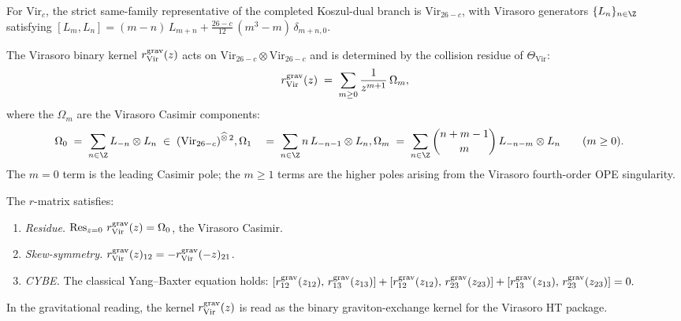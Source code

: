 \begin{construction}
\label{constr:thqg-V-vir-r-explicit}
For $\mathrm{Vir}_c$, the strict same-family representative of the
completed Koszul-dual branch is $\mathrm{Vir}_{26-c}$, with Virasoro
generators $\{L_n\}_{n \in \Z}$ satisfying
$[L_m, L_n] = (m-n)\,L_{m+n}
+ \frac{26-c}{12}\,(m^3-m)\,\delta_{m+n,0}$.

The Virasoro binary kernel $r^{\mathrm{grav}}_{\mathrm{Vir}}(z)$ acts on
$\mathrm{Vir}_{26-c} \otimes \mathrm{Vir}_{26-c}$ and is determined
by the collision residue of $\Theta_{\mathrm{Vir}}$:
\begin{equation}%
\rgrav_{\mathrm{Vir}}(z)
\;=\;
\sum_{m \geq 0}
\frac{1}{z^{m+1}}\,
\Omega_m,
\end{equation}
where the $\Omega_m$ are the Virasoro Casimir components:
\begin{align}
\Omega_0
&\;=\;
\sum_{n \in \Z}
L_{-n} \otimes L_n
\;\in\;
(\mathrm{Vir}_{26-c})^{\widehat{\otimes}\,2},
\Omega_1
&\;=\;
\sum_{n \in \Z}
n\,L_{-n-1} \otimes L_n,
\Omega_m
&\;=\;
\sum_{n \in \Z}
\binom{n+m-1}{m}\,L_{-n-m} \otimes L_n
\qquad (m \geq 0).
\end{align}
The $m = 0$ term is the leading Casimir pole; the $m \geq 1$ terms
are the higher poles arising from the Virasoro fourth-order OPE
singularity.

The $r$-matrix satisfies:
\begin{enumerate}[label=\textup{(\roman*)}]
\item \emph{Residue.}\;
 $\operatorname{Res}_{z=0}\,r^{\mathrm{grav}}_{\mathrm{Vir}}(z) = \Omega_0$, the
 Virasoro Casimir.
\item \emph{Skew-symmetry.}\;
 $r^{\mathrm{grav}}_{\mathrm{Vir}}(z)_{12} = -r^{\mathrm{grav}}_{\mathrm{Vir}}(-z)_{21}$.
\item \emph{CYBE.}\;
 The classical Yang--Baxter equation holds:
 $[r^{\mathrm{grav}}_{12}(z_{12}),\,r^{\mathrm{grav}}_{13}(z_{13})]
 + [r^{\mathrm{grav}}_{12}(z_{12}),\,r^{\mathrm{grav}}_{23}(z_{23})]
 + [r^{\mathrm{grav}}_{13}(z_{13}),\,r^{\mathrm{grav}}_{23}(z_{23})]
 = 0.$
\end{enumerate}
\end{construction}

In the gravitational reading, the kernel
$r^{\mathrm{grav}}_{\mathrm{Vir}}(z)$ is read as the binary graviton-exchange
kernel for the Virasoro HT package.

